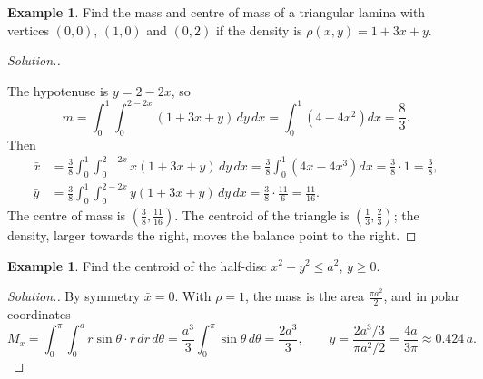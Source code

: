 \documentclass[11pt,a4paper]{article}
\theoremstyle{definition}
\newtheorem{exa}[thm]{Example}
\newenvironment{solution}
  {\renewcommand{\qedsymbol}{}\begin{proof}[\textit{Solution}.]}
  {\end{proof}}
\begin{document}
\begin{exa}
\label{ex:centremass}
Find the mass and centre of mass of a triangular lamina with vertices $(0,0)$,
$(1,0)$ and $(0,2)$ if the density is $\rho (x,y) = 1 + 3x + y$.
\end{exa}

\begin{solution}

\begin{figure}[H]
\centering
{}
\end{figure}

The hypotenuse is $y = 2 - 2x$, so
\[m = \int^1_0 \int^{2-2x}_0(1 + 3x + y)\, dy \, dx = \int_0^1 \left(4 -
4x^2\right)dx = \frac{8}{3} .\]
Then
\begin{align*}
\bar x & = \frac{3}{8}\int^1_0 \int^{2 - 2x}_0 x(1 + 3x + y)\,dy\,dx =
\frac38\int_0^1\left(4x - 4x^3\right)dx = \frac38\cdot 1 = \frac{3}{8},\\
\bar y & = \frac{3}{8}\int^1_0 \int^{2 - 2x}_0 y(1 + 3x + y)\,dy\,dx =
\frac38\cdot\frac{11}{6} = \frac{11}{16} .
\end{align*}
The centre of mass is $\left(\frac38,\frac{11}{16}\right)$. The centroid of the
triangle is $\left(\frac13,\frac23\right)$; the density, larger towards the
right, moves the balance point to the right.
\end{solution}

\begin{exa}
\label{ex:semicircle}
Find the centroid of the half-disc $x^2 + y^2\leq a^2$, $y\geq 0$.
\end{exa}

\begin{solution}
By symmetry $\bar x = 0$. With $\rho = 1$, the mass is the area
$\frac{\pi a^2}{2}$, and in polar coordinates
\[M_x = \int_0^\pi\int_0^a r\sin\theta\cdot r\,dr\,d\theta = \frac{a^3}{3}\int_0^\pi
\sin\theta\,d\theta = \frac{2a^3}{3},\qquad \bar y = \frac{2a^3/3}{\pi a^2/2} =
\frac{4a}{3\pi}\approx 0.424\,a .\]
\end{solution}
\end{document}
